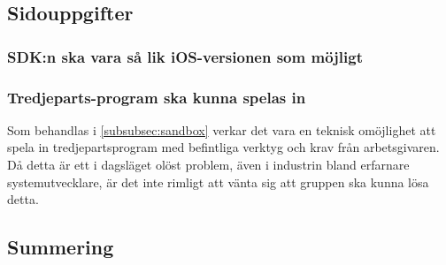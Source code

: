 \subsection{Sidouppgifter}
\subsubsection{SDK:n ska vara så lik iOS-versionen som möjligt}

\subsubsection{Tredjeparts-program ska kunna spelas in}
Som behandlas i \ref{subsubsec:sandbox} verkar det vara en teknisk omöjlighet att spela in tredjepartsprogram med befintliga verktyg och krav från arbetsgivaren. Då detta är ett i dagsläget olöst problem, även i industrin bland erfarnare systemutvecklare, är det inte rimligt att vänta sig att gruppen ska kunna lösa detta.

\subsection{Summering}
